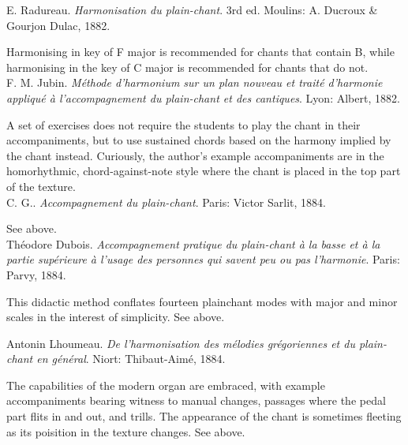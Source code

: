     \parindent=0pt
    \hangindent=0pt
  E. Radureau. \emph{Harmonisation du plain-chant}. 3rd ed. Moulins:  A. Ducroux \& Gourjon Dulac, 1882.

     \parindent=20pt
     \hangindent=20pt
     Harmonising in key of F major is recommended for chants that contain B\flat{}, while harmonising in the key of C major is recommended for chants that do not.\\

    \parindent=0pt
    \hangindent=0pt
  F. M. Jubin. \emph{Méthode d'harmonium sur un plan nouveau et traité d'harmonie appliqué à l'accompagnement du plain-chant et des cantiques}. Lyon:  Albert, 1882.

     \parindent=20pt
     \hangindent=20pt
     A set of exercises does not require the students to play the chant in their accompaniments, but to use sustained chords based on the harmony implied by the chant instead. Curiously, the author's example accompaniments are in the homorhythmic, chord-against-note style where the chant is placed in the top part of the texture.\\

    \parindent=0pt
    \hangindent=0pt
  C. G.. \emph{Accompagnement du plain-chant}. Paris:  Victor Sarlit, 1884.

     \parindent=20pt
     \hangindent=20pt
     See  above.\\

    \parindent=0pt
    \hangindent=0pt
  Théodore Dubois. \emph{Accompagnement pratique du plain-chant à la basse et à la partie supérieure à l'usage des personnes qui savent peu ou pas l'harmonie}. Paris:  Parvy, 1884.

     \parindent=20pt
     \hangindent=20pt
     This didactic method conflates fourteen plainchant modes with major and minor scales in the interest of simplicity. See  above.\\\pagebreak{}

    \parindent=0pt
    \hangindent=0pt
  Antonin Lhoumeau. \emph{De l'harmonisation des mélodies grégoriennes et du plain-chant en général}. Niort:  Thibaut-Aimé, 1884.

     \parindent=20pt
     \hangindent=20pt
     The capabilities of the modern organ are embraced, with example accompaniments bearing witness to manual changes, passages where the pedal part flits in and out, and trills. The appearance of the chant is sometimes fleeting as its poisition in the texture changes. See  above.\\

